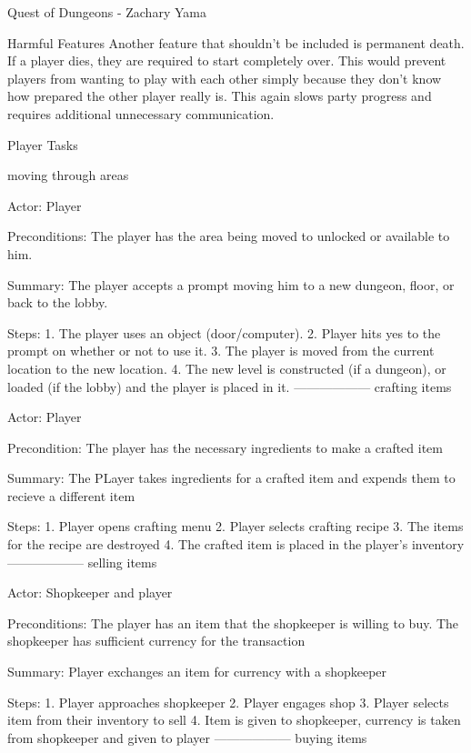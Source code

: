 \documentclass[12pt]{report}
\begin{document}
\begin{section}{Quest of Dungeons - Zachary Yama}
\begin{subsection}{Harmful Features}
Another feature that shouldn’t be included is permanent death. If a player dies, they are required to 
start completely over. This would prevent players from wanting to play with each other simply because 
they don’t know how prepared the other player really is. This again slows party progress and requires 
additional unnecessary communication.
 
\end{subsection}
\end{section}

\begin{section}{Player Tasks} %

moving through areas %

Actor: Player

Preconditions: The player has the area being moved to unlocked or available to him.

Summary: The player accepts a prompt moving him to a new dungeon, floor, or back to the lobby.

Steps:
1. The player uses an object (door/computer).
2. Player hits yes to the prompt on whether or not to use it.
3. The player is moved from the current location to the new location.
4. The new level is constructed (if a dungeon), or loaded (if the lobby) and the player is placed in it.
------------------
crafting items %

Actor: Player

Precondition: The player has the necessary ingredients to make a crafted item

Summary: The PLayer takes ingredients for a crafted item and expends them to recieve a different item

Steps:
1. Player opens crafting menu
2. Player selects crafting recipe
3. The items for the recipe are destroyed
4. The crafted item is placed in the player's inventory
------------------
selling items %

Actor: Shopkeeper and player

Preconditions: The player has an item that the shopkeeper is willing to buy. The shopkeeper has sufficient
currency for the transaction

Summary: Player exchanges an item for currency with a shopkeeper

Steps: 
1. Player approaches shopkeeper
2. Player engages shop
3. Player selects item from their inventory to sell
4. Item is given to shopkeeper, currency is taken from shopkeeper and given to player
------------------
buying items %


\end{section}
\end{document}
